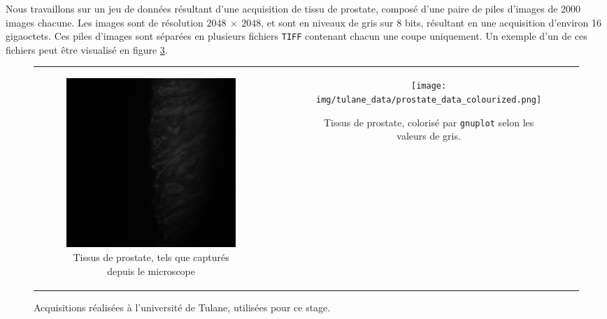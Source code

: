 {{        Nous travaillons sur un jeu de données résultant d'une acquisition de tissu de prostate, composé d'une paire de piles d'images de 2000 images chacune. Les images sont de résolution $2048~\times~2048$, et sont en niveaux de gris sur 8 bits, résultant en une acquisition d'environ 16 gigaoctets. Ces piles d'images sont séparées en plusieurs fichiers \texttt{TIFF} contenant chacun une coupe uniquement. Un exemple d'un de ces fichiers peut être visualisé en figure \ref{img:data:both_prostate_samples}.

        \begin{figure}[ht]
            \centering
            \begin{tabular}{ccc}
                \begin{subfigure}[t]{.45\linewidth}
                    \centering
                    \includegraphics[width=.8\linewidth]{img/tulane_data/prostate_tulane.png}
                    \captionsetup{width=.8\linewidth}
                    \caption{Tissus de prostate, tels que capturés depuis le microscope}
                    \label{img:data:prostate}
                \end{subfigure}& \hfill &
                \begin{subfigure}[t]{.45\linewidth}
                    \centering
                    \texttt{[image: img/tulane\_data/prostate\_data\_colourized.png]}
                    \captionsetup{width=.8\linewidth}
                    \caption{Tissus de prostate, colorisé par \texttt{gnuplot} selon les valeurs de gris.}
                    \label{img:data:prostate_coloured}
                \end{subfigure}
            \end{tabular}
            \captionsetup{width=.8\linewidth}
            \caption{Acquisitions réalisées à l'université de Tulane, utilisées pour ce stage.}
            \label{img:data:both_prostate_samples}
        \end{figure}

}}
